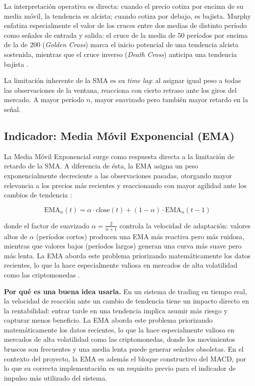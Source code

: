 La interpretación operativa es directa: cuando el precio cotiza por encima de su media móvil, la tendencia es alcista; cuando cotiza por debajo, es bajista. Murphy enfatiza especialmente el valor de los cruces entre dos medias de distinto período como señales de entrada y salida: el cruce de la media de 50 períodos por encima de la de 200 (\textit{Golden Cross}) marca el inicio potencial de una tendencia alcista sostenida, mientras que el cruce inverso (\textit{Death Cross}) anticipa una tendencia bajista \parencite{murphy_technical_1999}.

La limitación inherente de la SMA es su \textit{time lag}: al asignar igual peso a todas las observaciones de la ventana, reacciona con cierto retraso ante los giros del mercado. A mayor período $n$, mayor suavizado pero también mayor retardo en la señal.

\subsection{Indicador: Media Móvil Exponencial (EMA)}

La Media Móvil Exponencial surge como respuesta directa a la limitación de retardo de la SMA. A diferencia de ésta, la EMA asigna un peso exponencialmente decreciente a las observaciones pasadas, otorgando mayor relevancia a los precios más recientes y reaccionando con mayor agilidad ante los cambios de tendencia \parencite{murphy_technical_1999}:

$$\text{EMA}_n(t) = \alpha \cdot \text{close}(t) + (1-\alpha) \cdot \text{EMA}_n(t-1)$$

donde el factor de suavizado $\alpha = \frac{2}{n+1}$ controla la velocidad de adaptación: valores altos de $\alpha$ (períodos cortos) producen una EMA más reactiva pero más ruidosa, mientras que valores bajos (períodos largos) generan una curva más suave pero más lenta. La EMA aborda este problema priorizando matemáticamente los datos recientes, lo que la hace especialmente valiosa en mercados de alta volatilidad como las criptomonedas \parencite{katsiampa_volatility_2017}.

\textbf{Por qué es una buena idea usarla.} En un sistema de trading en tiempo real, la velocidad de reacción ante un cambio de tendencia tiene un impacto directo en la rentabilidad: entrar tarde en una tendencia implica asumir más riesgo y capturar menos beneficio. La EMA aborda este problema priorizando matemáticamente los datos recientes, lo que la hace especialmente valiosa en mercados de alta volatilidad como las criptomonedas, donde los movimientos bruscos son frecuentes y una media lenta puede generar señales obsoletas. En el contexto del proyecto, la EMA es además el bloque constructivo del MACD, por lo que su correcta implementación es un requisito previo para el indicador de impulso más utilizado del sistema.

